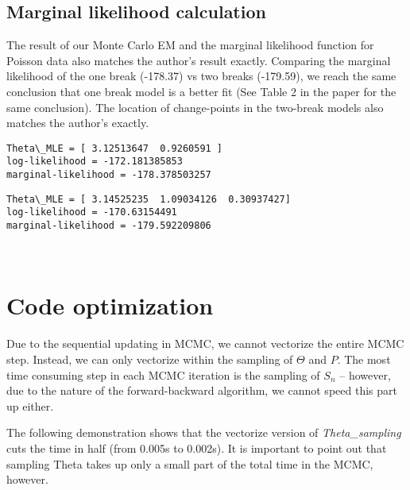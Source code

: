 \documentclass{article}
\begin{document}
    \subsection{Marginal likelihood
calculation}\label{marginal-likelihood-calculation}

    The result of our Monte Carlo EM and the marginal likelihood function
for Poisson data also matches the author's result exactly. Comparing the
marginal likelihood of the one break (-178.37) vs two breaks (-179.59),
we reach the same conclusion that one break model is a better fit (See
Table 2 in the paper for the same conclusion). The location of
change-points in the two-break models also matches the author's exactly.



    \begin{Verbatim}[commandchars=\\\{\}]
Theta\_MLE = [ 3.12513647  0.9260591 ]
log-likelihood = -172.181385853
marginal-likelihood = -178.378503257
    \end{Verbatim}



    \begin{Verbatim}[commandchars=\\\{\}]
Theta\_MLE = [ 3.14525235  1.09034126  0.30937427]
log-likelihood = -170.63154491
marginal-likelihood = -179.592209806
    \end{Verbatim}


    \begin{center}
    \end{center}
    { \hspace*{\fill} \\}
    
    \section{Code optimization}\label{code-optimization}

Due to the sequential updating in MCMC, we cannot vectorize the entire
MCMC step. Instead, we can only vectorize within the sampling of
$\Theta$ and $P$. The most time consuming step in each MCMC iteration is
the sampling of $S_n$ -- however, due to the nature of the
forward-backward algorithm, we cannot speed this part up either.

    The following demonstration shows that the vectorize version of
\emph{Theta\_sampling} cuts the time in half (from 0.005s to 0.002s). It
is important to point out that sampling Theta takes up only a small part
of the total time in the MCMC, however.
\end{document}
